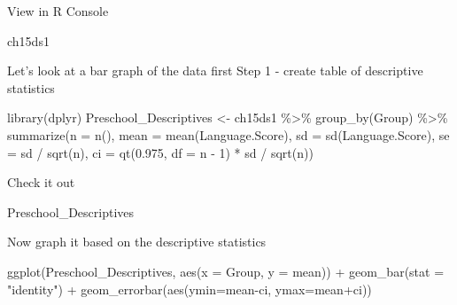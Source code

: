 \documentclass[
]{book}
\newenvironment{Shaded}{\begin{snugshade}}{\end{snugshade}}
\newcommand{\AttributeTok}[1]{\textcolor[rgb]{0.77,0.63,0.00}{#1}}
\newcommand{\DecValTok}[1]{\textcolor[rgb]{0.00,0.00,0.81}{#1}}
\newcommand{\FloatTok}[1]{\textcolor[rgb]{0.00,0.00,0.81}{#1}}
\newcommand{\FunctionTok}[1]{\textcolor[rgb]{0.00,0.00,0.00}{#1}}
\newcommand{\NormalTok}[1]{#1}
\newcommand{\OtherTok}[1]{\textcolor[rgb]{0.56,0.35,0.01}{#1}}
\newcommand{\SpecialCharTok}[1]{\textcolor[rgb]{0.00,0.00,0.00}{#1}}
\newcommand{\StringTok}[1]{\textcolor[rgb]{0.31,0.60,0.02}{#1}}
\begin{document}
View in R Console

\begin{Shaded}
\begin{Highlighting}[]
\NormalTok{ch15ds1}
\end{Highlighting}
\end{Shaded}

Let's look at a bar graph of the data first
Step 1 - create table of descriptive statistics

\begin{Shaded}
\begin{Highlighting}[]
\FunctionTok{library}\NormalTok{(dplyr)}
\NormalTok{Preschool\_Descriptives }\OtherTok{\textless{}{-}}\NormalTok{ ch15ds1 }\SpecialCharTok{\%\textgreater{}\%}
  \FunctionTok{group\_by}\NormalTok{(Group) }\SpecialCharTok{\%\textgreater{}\%}
  \FunctionTok{summarize}\NormalTok{(}\AttributeTok{n =} \FunctionTok{n}\NormalTok{(),}
            \AttributeTok{mean =} \FunctionTok{mean}\NormalTok{(Language.Score),}
            \AttributeTok{sd =} \FunctionTok{sd}\NormalTok{(Language.Score),}
            \AttributeTok{se =}\NormalTok{ sd }\SpecialCharTok{/} \FunctionTok{sqrt}\NormalTok{(n),}
            \AttributeTok{ci =} \FunctionTok{qt}\NormalTok{(}\FloatTok{0.975}\NormalTok{, }\AttributeTok{df =}\NormalTok{ n }\SpecialCharTok{{-}} \DecValTok{1}\NormalTok{) }\SpecialCharTok{*}\NormalTok{ sd }\SpecialCharTok{/} \FunctionTok{sqrt}\NormalTok{(n))}
\end{Highlighting}
\end{Shaded}

Check it out

\begin{Shaded}
\begin{Highlighting}[]
\NormalTok{Preschool\_Descriptives}
\end{Highlighting}
\end{Shaded}

Now graph it based on the descriptive statistics

\begin{Shaded}
\begin{Highlighting}[]
\FunctionTok{ggplot}\NormalTok{(Preschool\_Descriptives, }
       \FunctionTok{aes}\NormalTok{(}\AttributeTok{x =}\NormalTok{ Group, }
           \AttributeTok{y =}\NormalTok{ mean)) }\SpecialCharTok{+}
  \FunctionTok{geom\_bar}\NormalTok{(}\AttributeTok{stat =} \StringTok{"identity"}\NormalTok{) }\SpecialCharTok{+}
  \FunctionTok{geom\_errorbar}\NormalTok{(}\FunctionTok{aes}\NormalTok{(}\AttributeTok{ymin=}\NormalTok{mean}\SpecialCharTok{{-}}\NormalTok{ci,}
                    \AttributeTok{ymax=}\NormalTok{mean}\SpecialCharTok{+}\NormalTok{ci))}
\end{Highlighting}
\end{Shaded}
\end{document}
